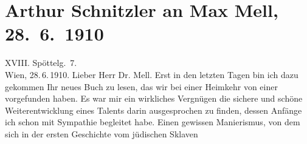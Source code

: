 

         
         \newcommand{\erwaehntePersonen}{Personen: Max Mell, Maria Mell, Olga Schnitzler}
         \newcommand{\erwaehnteOrte}{Orte: Edmund-Weiß-Gasse, Schweiz, Wien}
         \newcommand{\erwaehnteWerke}{Werke: Geschichte eines jüdischen Sklaven, Jägerhaussage und andere Novellen}
               \section[Arthur Schnitzler an Max Mell, 28. 6. 1910]{ Arthur Schnitzler an Max Mell, 28. 6. 1910}\nopagebreak{}\rehead{ }\begin{ledgroupsized}[t]{13cm}\normalsize\beginnumbering \toendnotes[C]{\smallbreak\pagebreak[2]} 
\toendnotes[C]{\smallbreak}\pstart
           \raggedleft{}{\pb}XVIII. Spöttelg. 7.{\\}Wien, 28. 6. 1910.\pend
           \pstart\center{}Lieber Herr Dr. Mell.\pend\pstart
           Erst in den letzten Tagen bin ich dazu gekommen Ihr neues Buch zu lesen, das wir bei einer
                    Heimkehr von einer \label{K_L01940_1v}\label{K_L01940_1h}
                    vorgefunden haben. Es war mir ein wirkliches Vergnügen die sichere und schöne
                    Weiterentwicklung eines Talents darin ausgesprochen zu finden, dessen Anfänge
                    ich schon mit Sympathie begleitet habe. Einen gewissen Manierismus, von dem sich
                    in der ersten Geschichte vom jüdischen Sklaven

\end{ledgroupsized}
